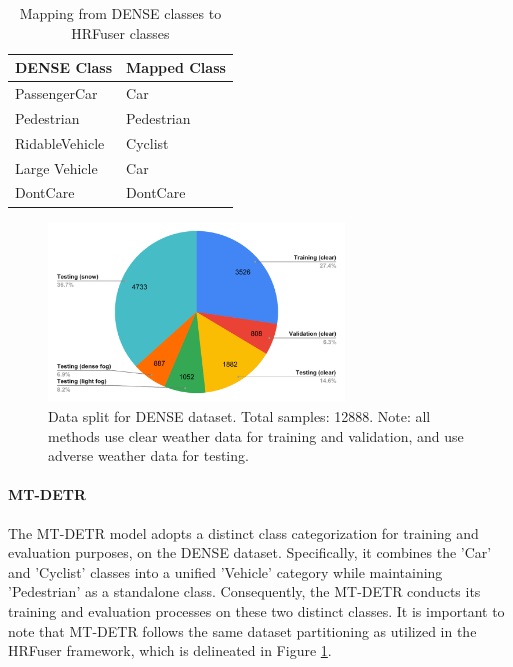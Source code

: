 \documentclass[report.tex]{subfiles}
\begin{document}
\begin{itemize}
            \begin{table}[h]
                \centering
                \caption{Mapping from DENSE classes to HRFuser classes \cite{broedermann2022hrfuser}}
                \begin{tabular}{|l|l|}
                \hline
                \textbf{DENSE Class} & \textbf{Mapped Class} \\ \hline
                PassengerCar         & Car                   \\ \hline
                Pedestrian           & Pedestrian            \\ \hline
                RidableVehicle       & Cyclist               \\ \hline
                Large Vehicle        & Car                   \\ \hline
                DontCare             & DontCare              \\ \hline
                \end{tabular}
                
                \label{tab:hrfuser_classes_dense}
            \end{table}

            \begin{figure}[h!]
                \centering
                \includegraphics[width=0.7\textwidth]{images/datasets/dense/dataset_split.pdf}
                \caption{Data split for DENSE dataset. Total samples: 12888. Note: all methods use clear weather data for training and validation, and use adverse weather data for testing.}
                \label{fig:hrfuser_data_split_dense}
            \end{figure}

            \paragraph*{MT-DETR}

            The MT-DETR model adopts a distinct class categorization for training and evaluation purposes, on the DENSE dataset. Specifically, it combines the 'Car' and 'Cyclist' classes into a unified 'Vehicle' category while maintaining 'Pedestrian' as a standalone class. Consequently, the MT-DETR conducts its training and evaluation processes on these two distinct classes. It is important to note that MT-DETR follows the same dataset partitioning as utilized in the HRFuser framework, which is delineated in Figure \ref{fig:hrfuser_data_split_dense}.


\end{itemize}
\end{document}

